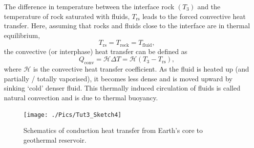 \documentclass[12pts,a4paper,amsmath,amssymb,floatfix]{article}%
\begin{document}
\begin{enumerate}[label=\bfseries Problem \arabic*:]
\begin{enumerate}
      The difference in temperature between the interface rock $\left(T_{3}\right)$ and the temperature of rock saturated with fluids, $T_{\text{rs}}$ leads to the forced convective heat transfer. Here, assuming that rocks and fluids close to the interface are in thermal equilibrium,
      \begin{displaymath}
        T_{\text{rs}} = T_{\text{rock}} = T_{\text{fluid}},
      \end{displaymath}
      the convective (or interphase) heat transfer can be defined as
      \begin{equation}
         Q_{\text{conv}} = \mathcal{H}\Delta T =  \mathcal{H}\left(T_{3}-T_{\text{rs}}\right),
      \end{equation}
      where $\mathcal{H}$ is the convective heat transfer coefficient. As the fluid is heated up (and partially / totally vaporised), it becomes less dense and is moved upward by sinking `cold' denser fluid. This thermally induced circulation of fluids is called natural convection and is due to thermal buoyancy.      
      
      \begin{figure}[h]%
        \begin{center}
          \texttt{[image: ./Pics/Tut3\_Sketch4]}
        \end{center}
        \caption{Schematics of conduction heat transfer from Earth's core to geothermal reservoir.}\label{SolutionProb3}
      \end{figure}


\end{enumerate}
\end{enumerate}
\end{document}
